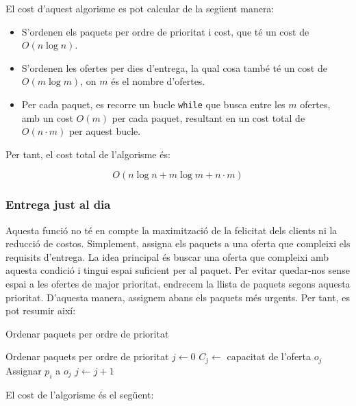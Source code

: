 \documentclass[a4paper]{article}
\begin{document}
	El cost d'aquest algorisme es pot calcular de la següent manera:
	
	\begin{itemize}
		\item S'ordenen els paquets per ordre de prioritat i cost, que té un cost de $O(n \log n)$.
		\item S'ordenen les ofertes per dies d'entrega, la qual cosa també té un cost de $O(m \log m)$, on $m$ és el nombre d'ofertes.
		\item Per cada paquet, es recorre un bucle \texttt{while} que busca entre les $m$ ofertes, amb un cost $O(m)$ per cada paquet, resultant en un cost total de $O(n \cdot m)$ per aquest bucle.
	\end{itemize}
	
	Per tant, el cost total de l'algorisme és:
	
	\[
	O(n \log n + m \log m + n \cdot m)
	\]
	
	\subsubsection{Entrega just al dia}
	\label{sec:GenSolIni_dia}
	
	Aquesta funció no té en compte la maximització de la felicitat dels clients ni la reducció de costos. Simplement, assigna els paquets a una oferta que compleixi els requisits d'entrega. La idea principal és buscar una oferta que compleixi amb aquesta condició i tingui espai suficient per al paquet. Per evitar quedar-nos sense espai a les ofertes de major prioritat, endrecem la llista de paquets segons aquesta prioritat. D'aquesta manera, assignem abans els paquets més urgents. Per tant, es pot resumir així:
	
	\begin{algorithm} [H]
		\caption{Ordenar paquets per ordre de prioritat}
		\begin{algorithmic}[1]
			\State Ordenar paquets per ordre de prioritat
			\State $j \gets 0$
			\State $C_j \gets$ capacitat de l'oferta $o_j$
			\State Assignar $p_i$ a $o_j$
			\Else
			\State $j \gets j + 1$ 
			\EndIf
			\EndWhile
			\EndFor
		\end{algorithmic}
	\end{algorithm}
	
	El cost de l'algorisme és el següent:
	
\end{document}
